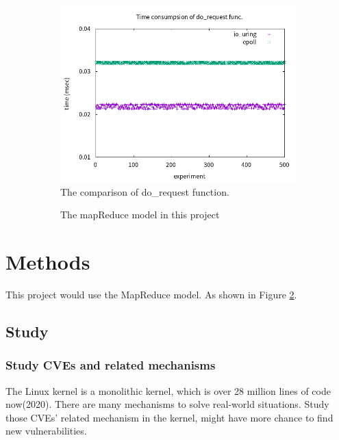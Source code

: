 \documentclass[12pt,a4paper]{article}
\begin{document}
\begin{figure}
  \centering
  \begin{subfigure}{.45\linewidth}
    \includegraphics[width=.99\textwidth]{io_uring.png}
    \caption{The comparison of do\_request function.}
    \label{fig:iouring}
  \end{subfigure}
  \begin{subfigure}{.45\linewidth}
    \caption[]{The mapReduce model in this project}
    \label{Fig:model}
  \end{subfigure}
  \caption{}
  \label{Fig:dummy}
\end{figure}

\newpage
\section{Methods}
This project would use the MapReduce model. As shown in Figure \ref*{Fig:model}.

\subsection{Study}
\subsubsection{Study CVEs and related mechanisms}
The Linux kernel is a monolithic kernel, which is over 28 million lines of code now(2020). There
are many mechanisms to solve real-world situations. Study those CVEs' related mechanism in the
kernel, might have more chance to find new vulnerabilities.
\end{document}
